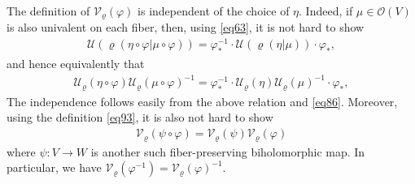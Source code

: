 \documentclass[12pt,a4paper,notitlepage]{report}
\theoremstyle{definition}
\theoremstyle{plain}
\newcommand{\mc}{\mathcal}
\newcommand{\scr}{\mathscr}
\numberwithin{equation}{section}
\begin{document}
The definition of $\mc V_\varrho(\varphi)$ is independent of the choice of $\eta$. Indeed, if $\mu\in\scr O(V)$ is also univalent on each fiber, then, using \eqref{eq63}, it is not hard to show
\begin{align*}
\mc U(\varrho(\eta\circ\varphi|\mu\circ\varphi))=\varphi_*^{-1}\cdot\mc U(\varrho(\eta|\mu))\cdot\varphi_*,
\end{align*}
and hence equivalently that
\begin{align}
\mc U_\varrho(\eta\circ\varphi)\mc U_\varrho(\mu\circ\varphi)^{-1}=\varphi_*^{-1}\cdot\mc U_\varrho(\eta)\mc U_\varrho(\mu)^{-1}\cdot\varphi_*,
\end{align}
The independence follows easily from the above relation and \eqref{eq86}. Moreover, using the definition \eqref{eq93}, it is also not hard to show
\begin{align}
\mc V_\varrho(\psi\circ\varphi)=\mc V_\varrho(\psi)\mc V_\varrho(\varphi)
\end{align}
where $\psi:V\rightarrow W$ is another such fiber-preserving biholomorphic map. In particular, we have $\mc V_\varrho(\varphi^{-1})=\mc V_\varrho(\varphi)^{-1}$.
\end{document}
